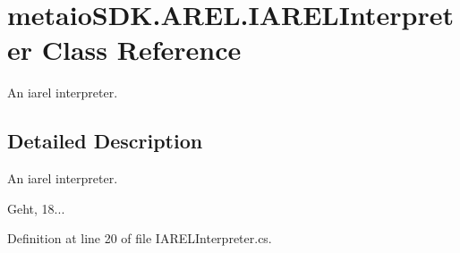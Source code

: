 \section{metaio\-S\-D\-K.\-A\-R\-E\-L.\-I\-A\-R\-E\-L\-Interpreter Class Reference}
\label{classmetaio_s_d_k_1_1_a_r_e_l_1_1_i_a_r_e_l_interpreter}


An iarel interpreter.  




\subsection{Detailed Description}
An iarel interpreter. 

Geht, 18... 

Definition at line 20 of file I\-A\-R\-E\-L\-Interpreter.\-cs.

